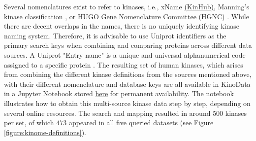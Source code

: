 \documentclass[9pt,lessons, pubversion]{livecoms}
\begin{document}
Several nomenclatures exist to refer to kinases, i.e., xName \href{http://www.kinhub.org/kinases.html}{(KinHub)}, Manning's kinase classification \cite{Manning2002}, or HUGO Gene Nomenclature Committee (HGNC) \cite{eyre2006hugo}. 
While there are decent overlaps in the names, there is no uniquely identifying kinase naming system. 
Therefore, it is advisable to use Uniprot identifiers as the primary search keys when combining and comparing proteins across different data sources. 
A Uniprot "Entry name" is a unique and universal alphanumerical code assigned to a specific protein \cite{pundir2016uniprot, zaru2023uniprot}. 
The resulting set of human kinases, which arises from combining the different kinase definitions from the sources mentioned above, with their different nomenclature and database keys are all available in KinoData in a Jupyter Notebook stored \href{https://github.com/openkinome/kinodata/blob/master/human-kinases/human_kinases.ipynb}{here} for permanent availability.
The notebook illustrates how to obtain this multi-source kinase data step by step, depending on several online resources.
The search and mapping resulted in around $500$ kinases per set, of which $473$ appeared in all five queried datasets (see Figure \ref{figure:kinome-definitions}).
\end{document}
